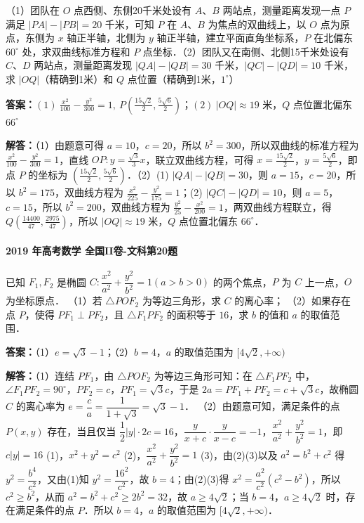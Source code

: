 \documentclass[UTF8,a4paper,11pt]{ctexart}
\begin{document}
（1）团队在 $O$ 点西侧、东侧20千米处设有 $A$、$B$ 两站点，测量距离发现一点 $P$ 满足 $|PA|-|PB|=20$ 千米，可知 $P$ 在 $A$、$B$ 为焦点的双曲线上，以 $O$ 点为原点，东侧为 $x$ 轴正半轴，北侧为 $y$ 轴正半轴，建立平面直角坐标系，$P$ 在北偏东 $60^\circ$ 处，求双曲线标准方程和 $P$ 点坐标．\newline（2）团队又在南侧、北侧15千米处设有 $C$、$D$ 两站点，测量距离发现 $|QA|-|QB|=30$ 千米，$|QC|-|QD|=10$ 千米，求 $|OQ|$（精确到1米）和 $Q$ 点位置（精确到1米，$1^\circ$）

\textbf{答案：}$(1)\ \frac{x^2}{100}-\frac{y^2}{300}=1,\ P(\frac{15\sqrt{2}}{2},\frac{5\sqrt{6}}{2})$；$(2)\ |OQ|\approx 19$ 米，$Q$ 点位置北偏东 $66^\circ$\par

\textbf{解答：}（1）由题意可得 $a=10$，$c=20$，所以 $b^2=300$，所以双曲线的标准方程为 $\frac{x^2}{100}-\frac{y^2}{300}=1$，直线 $OP:y=\frac{\sqrt{3}}{3}x$，联立双曲线方程，可得 $x=\frac{15\sqrt{2}}{2}$，$y=\frac{5\sqrt{6}}{2}$，即点 $P$ 的坐标为 $(\frac{15\sqrt{2}}{2},\frac{5\sqrt{6}}{2})$．\newline（2）(1) $|QA|-|QB|=30$，则 $a=15$，$c=20$，所以 $b^2=175$，双曲线方程为 $\frac{x^2}{225}-\frac{y^2}{175}=1$；(2) $|QC|-|QD|=10$，则 $a=5$，$c=15$，所以 $b^2=200$，双曲线方程为 $\frac{y^2}{25}-\frac{x^2}{200}=1$，两双曲线方程联立，得 $Q(\frac{14400}{47},\frac{2975}{47})$，所以 $|OQ|\approx 19$ 米，$Q$ 点位置北偏东 $66^\circ$．

\paragraph{2019 年高考数学 全国II卷-文科第20题}

已知 $F_1,F_2$ 是椭圆 $C:\dfrac{x^2}{a^2}+\dfrac{y^2}{b^2}=1(a>b>0)$ 的两个焦点，$P$ 为 $C$ 上一点，$O$ 为坐标原点．
（1）若 $\triangle POF_2$ 为等边三角形，求 $C$ 的离心率；
（2）如果存在点 $P$，使得 $PF_1\perp PF_2$，且 $\triangle F_1PF_2$ 的面积等于 $16$，求 $b$ 的值和 $a$ 的取值范围．

\textbf{答案：}（1）$e=\sqrt{3}-1$；（2）$b=4$，$a$ 的取值范围为 $[4\sqrt{2},+\infty)$\par

\textbf{解答：}（1）连结 $PF_1$，由 $\triangle POF_2$ 为等边三角形可知：在 $\triangle F_1PF_2$ 中，$\angle F_1PF_2=90^\circ$，$PF_2=c$，$PF_1=\sqrt{3}c$，于是 $2a=PF_1+PF_2=c+\sqrt{3}c$，故椭圆 $C$ 的离心率为 $e=\dfrac{c}{a}=\dfrac{1}{1+\sqrt{3}}=\sqrt{3}-1$．
（2）由题意可知，满足条件的点 $P(x,y)$ 存在，当且仅当 $\dfrac{1}{2}|y|\cdot2c=16$，$\dfrac{y}{x+c}\cdot\dfrac{y}{x-c}=-1$，$\dfrac{x^2}{a^2}+\dfrac{y^2}{b^2}=1$，即 $c|y|=16$ (1)，$x^2+y^2=c^2$ (2)，$\dfrac{x^2}{a^2}+\dfrac{y^2}{b^2}=1$ (3)，由(2)(3)以及 $a^2=b^2+c^2$ 得 $y^2=\dfrac{b^4}{c^2}$，又由(1)知 $y^2=\dfrac{16^2}{c^2}$，故 $b=4$；由(2)(3)得 $x^2=\dfrac{a^2}{c^2}(c^2-b^2)$，所以 $c^2\ge b^2$，从而 $a^2=b^2+c^2\ge 2b^2=32$，故 $a\ge 4\sqrt{2}$；当 $b=4$，$a\ge 4\sqrt{2}$ 时，存在满足条件的点 $P$．所以 $b=4$，$a$ 的取值范围为 $[4\sqrt{2},+\infty)$．
\end{document}
